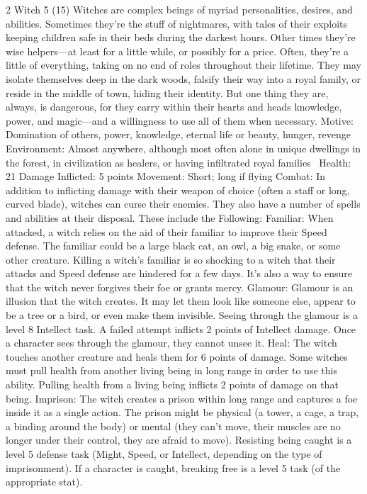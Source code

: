 \begin{multicols}{2}
Witch 5 (15)
Witches are complex beings of myriad personalities, desires, and abilities. Sometimes they’re the stuff of nightmares, with tales of their exploits keeping children safe in their beds during the darkest hours. Other times they’re wise helpers—at least for a little
while, or possibly for a price. Often, they’re a little of everything, taking on no end of roles throughout their lifetime. They may isolate themselves deep in the dark woods, falsify their way into a royal family, or reside in the middle of town, hiding their identity.
But one thing they are, always, is dangerous, for they carry within their hearts and heads knowledge, power, and magic—and a willingness to use all of them when necessary. Motive: Domination of others, power, knowledge, eternal life or beauty, hunger, revenge Environment: Almost anywhere, although most often alone in unique dwellings in the
forest, in civilization as healers, or having infiltrated royal families 
Health: 21
Damage Inflicted: 5 points
Movement: Short; long if flying
Combat: In addition to inflicting damage with their weapon of choice (often a staff or long,
curved blade), witches can curse their enemies.
They also have a number of spells and abilities at their disposal. These include the
Following:
Familiar: When attacked, a witch relies on the aid of their familiar to improve their Speed
defense. The familiar could be a large black cat, an owl, a big snake, or some other creature. Killing a witch’s familiar is so shocking to a witch that their attacks and Speed defense are hindered for a few days. It’s also a way to ensure that the witch never forgives their foe or grants mercy.
Glamour: Glamour is an illusion that the witch creates. It may let them look like someone else, appear to be a tree or a bird, or even make them invisible. Seeing through the glamour is a level 8 Intellect task. A failed attempt inflicts 2 points of Intellect damage. Once a character sees through the glamour, they cannot unsee it.
Heal: The witch touches another creature and heals them for 6 points of damage. Some witches must pull health from another living being in long range in order to use this ability. Pulling health from a living being inflicts 2 points of damage on that being.
Imprison: The witch creates a prison within long range and captures a foe inside it as a single action. The prison might be physical (a tower, a cage, a trap, a binding around the body) or mental (they can’t move, their muscles are no longer under their control, they are afraid to move). Resisting being caught is a level 5 defense task (Might, Speed, or Intellect, depending on the type of imprisonment). If a character is caught, breaking free is a level 5 task (of the appropriate stat).

\end{multicols}

